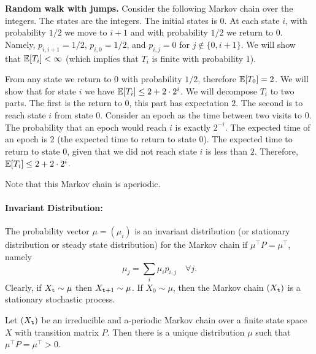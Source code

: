\begin{example}
{\bf Random walk with jumps.}
%
Consider the following Markov chain over the integers. The states
are the integers. The initial states is $0$. At each state $i$, with
probability $1/2$ we move to $i+1$ and with probability $1/2$ we
return to $0$. Namely, $p_{i,i+1}=1/2$, $p_{i,0}=1/2$, and $p_{i,j}
=0$ for $j \not\in \{0,i+ 1\}$. We will show that $\mathbb{E}[T_i]<\infty$
(which implies that $T_i$ is finite with probability $1$).

From any state we return to $0$ with probability $1/2$, therefore
$\mathbb{E}[T_0]=2$. We will show that for state $i$ we have
$\mathbb{E}[T_i]\leq2+2\cdot 2^i$. We will decompose $T_i$ to two parts. The
first is the return to $0$, this part has expectation $2$. The
second is to reach state $i$ from state $0$. Consider an epoch as
the time between two visits to $0$. The probability that an epoch
would reach $i$ is exactly $2^{-i}$. The expected time of an epoch
is $2$ (the expected time to return to state $0$). The expected time
to return to state $0$, given that we did not reach state $i$ is
less than $2$. Therefore, $\mathbb{E}[T_i]\leq2+2\cdot 2^i$.

Note that this Markov chain is aperiodic.
\end{example}



\paragraph{Invariant Distribution:} %
The probability vector $\mu  = ({\mu_i})$ is an invariant
distribution (or stationary distribution or steady state
distribution) for the Markov chain if $\mu^\top P = \mu^\top$,
namely
\[{\mu_j} = \sum_i {{\mu_i}} {p_{i,j}}\quad \forall j.\]
Clearly, if ${X_{\tt t}} \sim \mu $ then ${X_{{\tt t} + 1}} \sim \mu
$. If ${X_0} \sim \mu $, then the Markov chain $({X_{\tt t}})$ is a
stationary stochastic process.


\begin{theorem}
\label{Thm:MC-stationary}
 Let $({X_{\tt t}})$ be an irreducible and
a-periodic Markov chain over a finite state space $X$ with
transition matrix $P$. Then there is a unique distribution $\mu$
such that $\mu^\top P = \mu^\top >0$.
\end{theorem}

